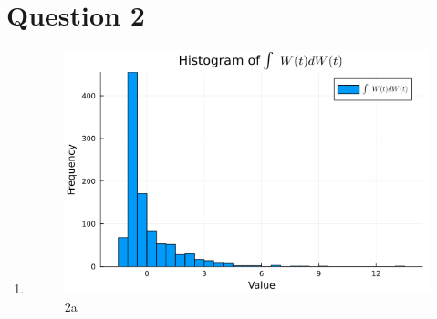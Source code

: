 \documentclass{article}
\begin{document}
\section*{Question 2}

\begin{enumerate}
    \item 
        \begin{figure}[H]
            \centering
            \includegraphics[scale=0.6]{imgs/2a.png}
            \caption{2a}
            \label{fig:2a}
        \end{figure}


\end{enumerate}
\end{document}
